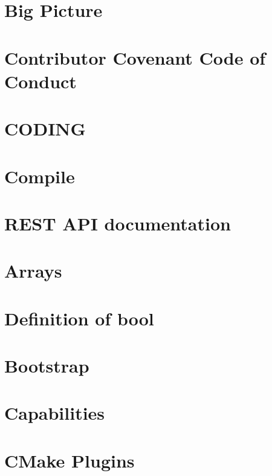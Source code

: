\documentclass[twoside]{book}
\newcommand{\+}{\discretionary{\mbox{\scriptsize$\hookleftarrow$}}{}{}}
\begin{document}
\chapter{Big Picture}
\label{doc_BIGPICTURE_md}
\hypertarget{doc_BIGPICTURE_md}{}

\chapter{Contributor Covenant Code of Conduct}
\label{doc_code_of_conduct_md}
\hypertarget{doc_code_of_conduct_md}{}

\chapter{C\+O\+D\+I\+N\+G}
\label{doc_CODING_md}
\hypertarget{doc_CODING_md}{}

\chapter{Compile}
\label{doc_COMPILE_md}
\hypertarget{doc_COMPILE_md}{}

\chapter{R\+E\+S\+T A\+P\+I documentation}
\label{doc_decisions_api_documentation_md}
\hypertarget{doc_decisions_api_documentation_md}{}

\chapter{Arrays}
\label{doc_decisions_array_md}
\hypertarget{doc_decisions_array_md}{}

\chapter{Definition of bool}
\label{doc_decisions_bool_md}
\hypertarget{doc_decisions_bool_md}{}

\chapter{Bootstrap}
\label{doc_decisions_bootstrap_md}
\hypertarget{doc_decisions_bootstrap_md}{}

\chapter{Capabilities}
\label{doc_decisions_capabilities_md}
\hypertarget{doc_decisions_capabilities_md}{}

\chapter{C\+Make Plugins}
\label{doc_decisions_cmake_plugins_md}
\hypertarget{doc_decisions_cmake_plugins_md}{}

\end{document}
